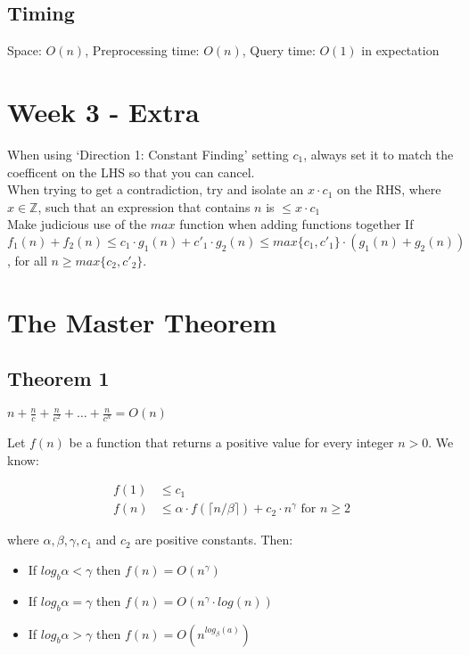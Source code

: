\documentclass[10pt,a4paper]{article}
\begin{document}
\begin{multicols}{3}
    \subsection{Timing}
    Space: $O(n)$, Preprocessing time: $O(n)$, Query time: $O(1)$ in expectation

    \section{Week 3 - Extra}
    When using `Direction 1: Constant Finding' setting $c_1$, always set it to match the coefficent on the LHS so that you can cancel.\\
    When trying to get a contradiction, try and isolate an $x \cdot c_1$ on the RHS, where $x \in \mathbb{Z}$, such that an expression that contains $n$ is $\leqslant x \cdot c_1$\\
    Make judicious use of the $max$ function when adding functions together
    If $f_1(n) + f_2(n) \leqslant c_1 \cdot g_1(n) +c'_1 \cdot g_2(n) \leqslant max\{c_1 , c'_1 \} \cdot (g_1(n) + g_2(n))$, for all $n \geqslant max\{c_2, c'_2\}$.\\
    
    \section{The Master Theorem}
    \subsection{Theorem 1}
    $n+\frac{n}{c}+\frac{n}{c^2}+\ldots+\frac{n}{c^h}=O(n)$
    
    Let $f(n)$ be a function that returns a positive value for every integer $n>0$. We know:
    
    \begin{align*}
        f(1) & \leqslant c_1\\
        f(n) & \leqslant \alpha \cdot f(\lceil n / \beta \rceil) + c_2 \cdot n^{\gamma} \text{ for } n \geqslant 2
    \end{align*}
    
    where $\alpha, \beta, \gamma, c_1$ and $c_2$ are positive constants. Then:
    
    \begin{itemize}
        \item If $log_{b} \alpha < \gamma$ then $f(n) = O(n^\gamma)$
        \item If $log_{b} \alpha = \gamma$ then $f(n) = O(n^\gamma \cdot log(n))$
        \item If $log_{b} \alpha > \gamma$ then $f(n) = O(n^{log_\beta(a)})$
    

\end{itemize}
\end{multicols}
\end{document}
